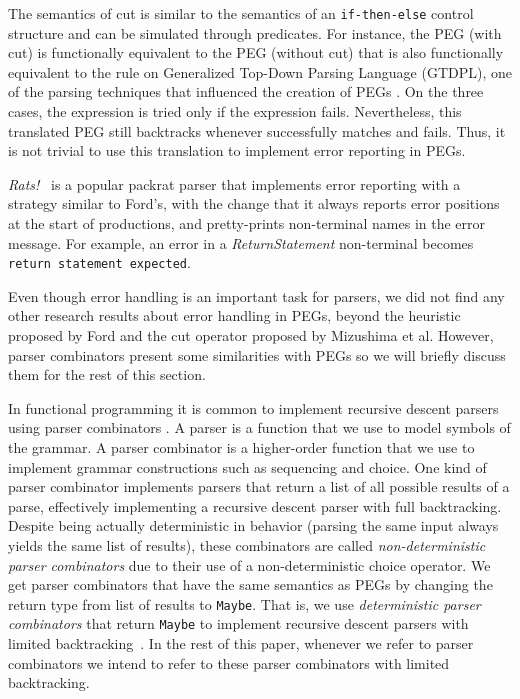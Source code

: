 \documentclass[3p,12pt,singlecolumn]{elsarticle}
\begin{document}
The semantics of cut is similar to the semantics of an
\texttt{if-then-else} control structure and
can be simulated through predicates.
For instance, the PEG (with cut)  is
functionally equivalent to the PEG (without cut)
 that is also functionally equivalent to
the rule  on Generalized Top-Down Parsing
Language (GTDPL), one of the parsing techniques that influenced the
creation of PEGs \cite{ford2002packrat,ford2002pappy,ford2004peg}.
On the three cases, the expression  is tried only if the expression
 fails.
Nevertheless, this translated PEG still backtracks 
whenever  successfully matches and  fails.
Thus, it is not trivial to use this translation to implement error
reporting in PEGs. 

\emph{Rats!}~\cite{grimm2006rats} is a popular packrat parser
that implements error reporting with a strategy similar to
Ford's, with the change that it always reports error positions
at the start of productions, and pretty-prints non-terminal names
in the error message. For example, an error in a {\em ReturnStatement}
non-terminal becomes {\tt return statement expected}.

Even though error handling is an important task for parsers,
we did not find any other research results about error handling in PEGs,
beyond the heuristic proposed by Ford and the cut operator
proposed by Mizushima et al.
However, parser combinators \cite{hutton1992hfp} present some
similarities with PEGs so we will briefly discuss them for the
rest of this section.

In functional programming it is common to implement recursive
descent parsers using parser combinators \cite{hutton1992hfp}.
A parser is a function that we use to model symbols of the
grammar.
A parser combinator is a higher-order function that we use to
implement grammar constructions such as sequencing and choice.
One kind of parser combinator implements parsers that
return a list of all possible results of a parse, effectively
implementing a recursive descent parser with full backtracking.
Despite being actually deterministic in behavior (parsing the
same input always yields the same list of results), these
combinators are called {\em non-deterministic parser 
combinators} due to their use of a non-deterministic choice operator.
We get parser combinators that have the same semantics as PEGs
by changing the return type from list of results to \texttt{Maybe}.
That is, we use {\em deterministic parser combinators} that return
\texttt{Maybe} to implement recursive descent parsers with limited
backtracking~\cite{spivey2012maybe}. 
In the rest of this paper, whenever we refer to parser combinators
we intend to refer to these parser combinators with limited backtracking.
\end{document}
